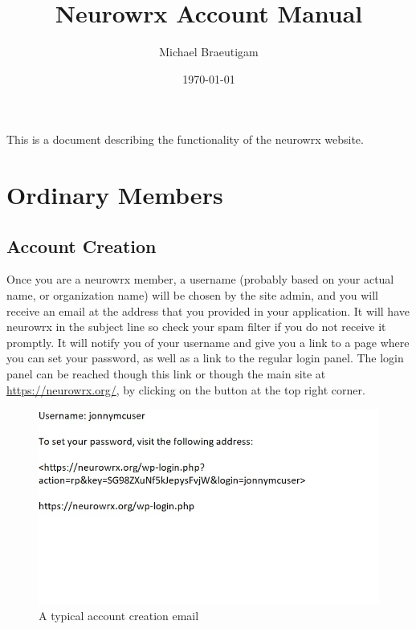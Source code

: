 \documentclass[10pt]{article}
\title{Neurowrx Account Manual}
\author{Michael Braeutigam}
\date{\today}
\begin{document}
\begin{titlepage}
\maketitle
\end{titlepage}

\linespread{1.15} %

\begin{executive}

This is a document describing the functionality of the neurowrx website.

\end{executive}

\tableofcontents


\section{Ordinary Members}

\subsection{Account Creation}

\begin{flushleft}
Once you are a neurowrx member, a username (probably based on your actual name, or organization name) will be chosen by the site admin, and you will receive an email at the address that you provided in your application.  It will have neurowrx in the subject line so check your spam filter if you do not receive it promptly.  It will notify you of your username and give you a link to a page where you can set your password, as well as a link to the regular login panel.  The login panel can be reached though this link or though the main site at \url{https://neurowrx.org/}, by clicking on the button at the top right corner. 
\end{flushleft}

\begin{figure}[h]
\centering
\caption{A typical account creation email}
\label{accountemail}
\includegraphics[scale=1.0]{images/accountcreation.jpg}
\end{figure}
\end{document}
